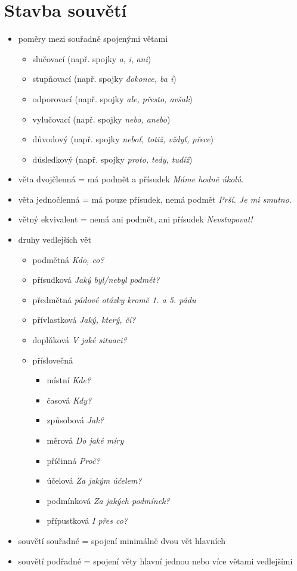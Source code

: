 \documentclass{memoir}
\begin{document}
\section*{Stavba souvětí}
\begin{itemize}
\item poměry mezi souřadně spojenými větami
    \begin{itemize}
    \item slučovací (např. spojky \textit{a}, \textit{i}, \textit{ani})
    \item stupňovací (např. spojky \textit{dokonce, ba i})
    \item odporovací (např. spojky \textit{ale, přesto, avšak})
    \item vylučovací (např. spojky \textit{nebo, anebo})
    \item důvodový (např. spojky \textit{neboť, totiž, vždyť, přece})
    \item důsledkový (např. spojky \textit{proto, tedy, tudíž})
    \end{itemize}
    \item věta dvojčlenná = má podmět a přísudek \hfill \textit{Máme hodně úkolů.}
   	\item věta jednočlenná = má pouze přísudek, nemá podmět \hfill \textit{Prší. Je mi smutno.}
   	\item větný ekvivalent = nemá ani podmět, ani přísudek \hfill \textit{Nevstupovat!}
    \item druhy vedlejších vět
    \begin{itemize}
    \item podmětná \hfill \textit{Kdo, co?}
   	\item přísudková \hfill \textit{Jaký byl/nebyl podmět?}
   	\item předmětná \hfill \textit{pádové otázky kromě 1. a 5. pádu}
   	\item přívlastková \hfill \textit{Jaký, který, čí?}
   	\item doplňková \hfill \textit{V jaké situaci?}
   	\item příslovečná
    \begin{itemize}
    \item místní \hfill \textit{Kde?}
   	\item časová \hfill \textit{Kdy?}
   	\item způsobová \hfill \textit{Jak?}
   	\item měrová \hfill \textit{Do jaké míry}
   	\item příčinná \hfill \textit{Proč?}
   	\item účelová \hfill \textit{Za jakým účelem?}
   	\item podmínková \hfill \textit{Za jakých podmínek?}
   	\item přípustková \hfill \textit{I přes co?}
    \end{itemize}
    \end{itemize}
   	\item souvětí souřadné = spojení minimálně dvou vět hlavních
   	\item souvětí podřadné = spojení věty hlavní jednou nebo více větami vedlejšími
\end{itemize}
\end{document}
